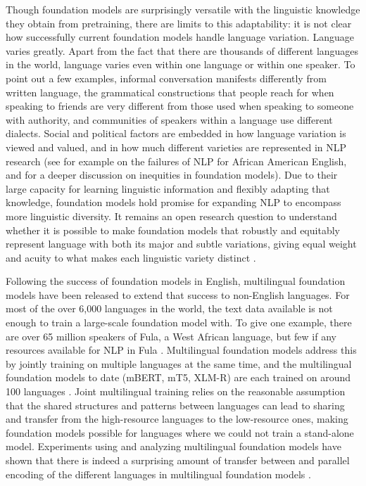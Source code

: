 Though foundation models are surprisingly versatile with the linguistic knowledge they obtain from pretraining,
there are limits to this adaptability: it is not clear how successfully current foundation models handle language variation.
Language varies greatly. Apart from the fact that there are thousands of different languages in the world, language varies even within one language or within one speaker. To point out a few examples, informal conversation manifests differently from written language, the grammatical constructions that people reach for when speaking to friends are very different from those used when speaking to someone with authority, and communities of speakers within a language use different dialects. Social and political factors are embedded in how language variation is viewed and valued, and in how much different varieties are represented in NLP research (see for example \citet{blodgett17} on the failures of NLP for African American English, and  for a deeper discussion on inequities in foundation models).
Due to their large capacity for learning linguistic information and flexibly adapting that knowledge, foundation models hold promise for expanding NLP to encompass more linguistic diversity. It remains an open research question to understand whether it is possible to make foundation models that robustly and equitably represent language with both its major and subtle variations, giving equal weight and acuity to what makes each linguistic variety distinct \citep[research posing and addressing this question includes][]{ponti2019modeling, bender2011achieving, joshi2020state}.

Following the success of foundation models in English, multilingual foundation models have been released to extend that success to non-English languages.
For most of the over 6,000 languages in the world, the text data available is not enough to train a large-scale foundation model with. 
To give one example, there are over 65 million speakers of Fula, a West African language, but few if any resources available for NLP in Fula \citep{nguer2020sencorpus}.
Multilingual foundation models address this by jointly training on multiple languages at the same time, and the multilingual foundation models to date (mBERT, mT5, XLM-R) are each trained on around 100 languages \citep{devlin2019bert, goyal2021larger, xue2020mt5}. Joint multilingual training relies on the reasonable assumption that the shared structures and patterns between languages can lead to sharing and transfer from the high-resource languages to the low-resource ones, making foundation models possible for languages where we could not train a stand-alone model.
Experiments using and analyzing multilingual foundation models have shown that there is indeed a surprising amount of transfer between and parallel encoding of the different languages in multilingual foundation models \citep{wu-dredze-2019-beto, choenni2020cross, pires2019multilingual, libovicky2019language, chi2020finding, papadimitriou2021deep, cao2019multilingual}.  

